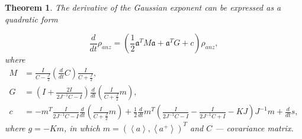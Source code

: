 \documentclass[12pt]{article}
\newtheorem{theorem}{Theorem}
\theoremstyle{definition}
\newcommand\bra{\left<}
\newcommand\ket{\right>}
\newcommand{\braket}[1]{\bra#1\ket}
\newcommand{\mf}[1]{\mathfrak{#1}}
\begin{document}
	\begin{theorem}
		\label{th:DerOfGaus}
		The derivative of the Gaussian exponent can be expressed as a quadratic form
		
		\begin{equation*}
			\frac{d}{dt}\rho_{anz} = (\frac{1}{2}\mf{a}^TM\mf{a} + \mf{a}^TG + c)\rho_{anz},
		\end{equation*}
		where
		\begin{align*}
			M &= \frac{I}{C - \frac{J}{2}}\left(\frac{d}{dt}C\right)\frac{I}{C + \frac{J}{2}},\\
			G &= \left(  I + \frac{2I}{2J^{-1}C - I}  \right)\frac{d}{dt}\left(\frac{I}{C + \frac{J}{2}}m\right),\\
			c &=-m^T\frac{I}{2J^{-1}C -  I}\frac{d}{dt}\left(\frac{I}{C + \frac{J}{2}}m\right) + \frac{1}{2}\frac{d}{dt}m^T\left( \frac{I}{2J^{-1}C - I} - \frac{I}{2J^{-1}C + I} - KJ \right)J^{-1}m + \frac{d}{dt}s,
		\end{align*}
		where $g = -Km$, in which $m = (\braket{a} , \braket{a^+})^T$ and $C$ --- covariance matrix.
	\end{theorem}
\end{document}
